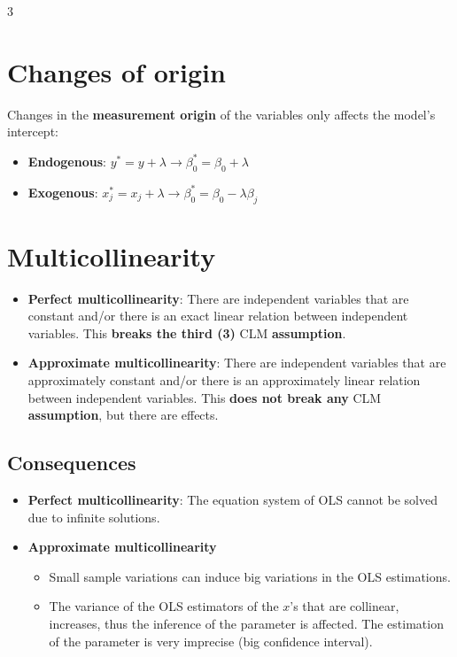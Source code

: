 \documentclass[10pt, a4paper, landscape]{article}
\begin{document}
\begin{multicols}{3}
\section*{Changes of origin}

Changes in the \textbf{measurement origin} of the variables only affects the model's intercept:

\begin{itemize}[leftmargin=*]
	\item \textbf{Endogenous}: \( y^{*} = y + \lambda \rightarrow \beta_{0}^{*} = \beta_{0} + \lambda \)
	\item \textbf{Exogenous}: \( x_{j}^{*} = x_{j} + \lambda \rightarrow \beta_{0}^{*} = \beta_{0} - \lambda \beta_{j} \)
\end{itemize}

\columnbreak

\section*{Multicollinearity}

\begin{itemize}[leftmargin=*]
	\item \textbf{Perfect multicollinearity}: There are independent variables that are constant and/or there is an exact linear relation between independent variables. This \textbf{breaks the third (3)} CLM \textbf{assumption}.
	\item \textbf{Approximate multicollinearity}: There are independent variables that are approximately constant and/or there is an approximately linear relation between independent variables. This \textbf{does not break any} CLM \textbf{assumption}, but there are effects.
\end{itemize}

\subsection*{Consequences}

\begin{itemize}[leftmargin=*]
	\item \textbf{Perfect multicollinearity}: The equation system of OLS cannot be solved due to infinite solutions.
	\item \textbf{Approximate multicollinearity}
	\begin{itemize}[leftmargin=*]
		\item Small sample variations can induce big variations in the OLS estimations.
		\item The variance of the OLS estimators of the \( x \)'s that are collinear, increases, thus the inference of the parameter is affected. The estimation of the parameter is very imprecise (big confidence interval).
	\end{itemize}
\end{itemize}


\end{multicols}
\end{document}
